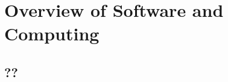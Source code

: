 \chapter{Overview of Software and Computing}
\label{ch:sw-comp-ov}


\section{??}
\label{sec:sw-comp-ov-??}

